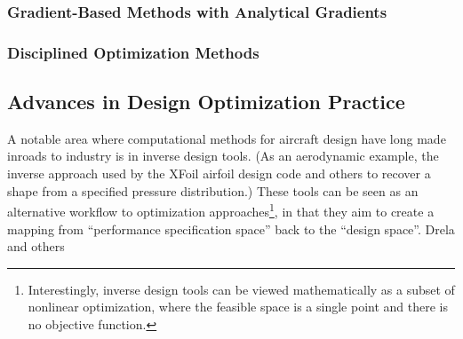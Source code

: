 \documentclass[12pt,vi,oneside]{report}
\begin{document}
    \subsubsection{Gradient-Based Methods with Analytical Gradients}


    \subsubsection{Disciplined Optimization Methods}

    \subsection{Advances in Design Optimization Practice}






    A notable area where computational methods for aircraft design have long made inroads to industry is in inverse design tools. (As an aerodynamic example, the inverse approach used by the XFoil airfoil design code \cite{drela_xfoil_1989} and others \cite{liebeck_blendedwingbody_1998} to recover a shape from a specified pressure distribution.) These tools can be seen as an alternative workflow to optimization approaches\footnote{Interestingly, inverse design tools can be viewed mathematically as a subset of nonlinear optimization, where the feasible space is a single point and there is no objective function.}, in that they aim to create a mapping from ``performance specification space'' back to the ``design space''. Drela \cite{drela_pros_1998} and others

%
%
%
\end{document}
